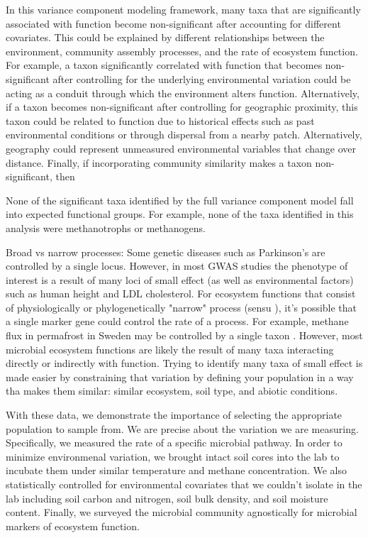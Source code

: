 \documentclass{article}
\begin{document}
In this variance component modeling framework, many taxa that are significantly
associated with function become non-significant after accounting for different
covariates. This could be explained by different relationships between the
environment, community assembly processes, and the rate of ecosystem function.
For example, a taxon significantly correlated with function that becomes
non-significant after controlling for the underlying environmental variation
could be acting as a conduit through which the environment alters function.
Alternatively, if a taxon becomes non-significant after controlling for
geographic proximity, this taxon could be related to function due to historical
effects such as past environmental conditions or through dispersal from a nearby
patch. Alternatively, geography could represent unmeasured environmental
variables that change over distance. Finally, if incorporating community
similarity makes a taxon non-significant, then 

None of the significant taxa identified by the full variance component model 
fall into expected functional groups. For example, none of the taxa identified
in this analysis were methanotrophs or methanogens.

Broad vs narrow processes: Some genetic diseases such as Parkinson's 
are controlled by a single locus. However, in most GWAS studies the phenotype of
interest is a result of many loci of small effect (as well as environmental
factors) such as human height and LDL cholesterol. For ecosystem functions that
consist of physiologically or phylogenetically "narrow" process (sensu
\cite{schimel1995b}), it's possible that a single marker gene could control the
rate of a process. For example, methane flux in permafrost in Sweden may be
controlled by a single taxon \citep{mccalley2014}. However, most microbial ecosystem functions are likely the result
of many taxa interacting directly or indirectly with function.
Trying to identify many taxa of small effect is made easier by constraining that
variation by defining your population in a way tha makes them similar: 
similar ecosystem, soil type, and abiotic conditions.

With these data, we demonstrate the
importance of selecting the appropriate population to sample from. We are
precise about the variation we are measuring. Specifically, we measured the rate
of a specific microbial pathway. In order to minimize environmenal variation, we
brought intact soil cores into the lab to incubate them under similar
temperature and methane concentration. We also statistically controlled for
environmental covariates that we couldn't isolate in the lab including soil
carbon and nitrogen, soil bulk density, and soil moisture content. Finally, we
surveyed the microbial community agnostically for microbial markers of ecosystem
function.
\end{document}
